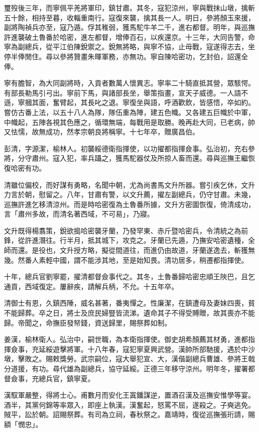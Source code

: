 \begin{pinyinscope}
璽歿後三年，而寧佩平羌將軍印，鎮甘肅。其冬，寇犯涼州，寧與戰抹山墩，擒斬五十餘，相持至暮，收輜重南行。寇復來襲，擒其長一人。明日，參將顏玉來援，副將陶禎兵亦至，寇乃遁。俘其稚弱，獲馬駝牛羊二千，進右都督。明年，與巡撫許進襲破土魯番於哈密，進左都督，增俸百石，以疾還京。十三年，大同告警，命寧為副總兵，從平江伯陳銳禦之。銳無將略，與寧不協，止毋戰，寇遂得志去，坐停半俸閒住。尋以參將贊畫朱暉軍務，亦無功。寧自陳哈密功，乞封伯，詔還全俸。

寧有膽智，為大同副將時，入貢者數萬人懷異志。寧率二十騎直抵其營，眾駭愕。有部長勒馬引弓出。寧前下馬，與諸部長坐，舉策指畫，宣天子威德。一人語不遜，寧摑其面，奮臂起，其長叱之退。寧復坐與語，呼酒歡飲，皆感悟，卒如約。嘗仿古番上法，以五十八人為隊，隊伍重為陣，建五色幟。又各建五巨幟於中軍，中幟起，五陣各視其色應之，循環無端，每戰用是取勝。晚再赴大同，已老病，帥又怯懦，故無成功，然孝宗朝良將稱寧。十七年卒，贈廣昌伯。

彭清，字源潔，榆林人。初襲綏德衛指揮使，以功擢都指揮僉事。弘治初，充右參將，分守肅州。寇入犯，率兵躡之，獲馬駝器仗及所掠人畜而還。尋與巡撫王繼恢復哈密有功。

清雖位偏校，而好謀有勇略，名聞中朝，尤為尚書馬文升所器。嘗引疾乞休，文升力言於朝，慰留之。八年，甘肅有警，以文升薦，擢左副總兵，仍守甘肅。未幾，巡撫許進乞移清涼州。而是時哈密復為土魯番所據，文升方密圖恢復，倚清成功，言「肅州多故，而清名著西域，不可易」，乃寢。

文升既得楊翥策，銳欲搗哈密襲牙蘭，乃發罕東、赤斤暨哈密兵，令清統之為前鋒，從許進潛往。行半月，抵其城下，攻克之。牙蘭已先遁，乃撫安哈密遺種，全師而還。是役也，文升授方略，擬從間道往，而進仍由故道，牙蘭遂逸去，斬獲無幾。然番人素輕中國，謂不能涉其地，至是始知畏。清功居多，稍遷都指揮使。

十年，總兵官劉寧罷，擢清都督僉事代之。其冬，土魯番歸哈密忠順王陜巴，且乞通貢，西域復定。屢辭疾，請解兵柄，不允。十五年卒。

清御士有恩，久鎮西陲，威名甚著，番夷憚之。性廉潔，在鎮遭母及妻妹四喪，貧不能歸葬。卒之日，將士及庶民婦豎皆流涕。遺命其子不得受賻贈，故其喪亦不能歸。帝聞之，命撫臣發帑錢，資送歸里，賜祭葬如制。

姜漢，榆林衛人。弘治中，嗣世職，為本衛指揮使。御史胡希顏薦其材勇，進都指揮僉事，充延綏遊擊將軍。十八年春，寇犯寧夏興武營。漢帥所部馳援，遇於中沙墩，擊敗之。賜敕獎勞。武宗嗣位，寇大舉犯宣、大，漢偕副總兵曹雄、參將王戟分道援，有功。尋代雄為副總兵，協守延綏。正德三年移守涼州。明年冬，擢署都督僉事，充總兵官，鎮寧夏。

漢馭軍嚴整，得將士心。甫數月而安化王寘鐇謀逆，置酒召漢及巡撫安惟學等宴。酒半，其黨何錦等率眾入，即座上執漢。漢奮起，怒罵不屈，遂殺之。子奭逃免。賊平，訟於朝。詔賜祭葬。有司為立祠，春秋祭之。嘉靖時，復從巡撫張珩請，賜額「憫忠」。


\end{pinyinscope}
